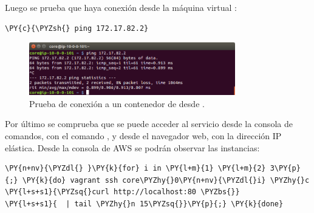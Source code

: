 Luego se prueba que haya conexión desde la máquina virtual :

\begin{framed_shaded}
\begin{Verbatim}[fontsize=\relsize{-2.5},fontseries=b,commandchars=\\\{\}]
\PY{c}{\PYZsh{} ping 172.17.82.2}
\end{Verbatim}
\end{framed_shaded}

\begin{figure}[H]
\centering
\includegraphics[width=0.8\textwidth]{images/figures/ping-1.png}
\caption{Prueba de conexión a un contenedor de  desde .}
\end{figure}

Por último se comprueba que se puede acceder al servicio desde la consola de comandos, con el comando , y desde el navegador web, con la dirección IP elástica. Desde la consola de AWS se podrán observar las instancias: 

\begin{framed_shaded}
\begin{Verbatim}[fontsize=\relsize{-2.5},fontseries=b,commandchars=\\\{\}]
\PY{n+nv}{\PYZdl{} }\PY{k}{for} i in \PY{l+m}{1} \PY{l+m}{2} 3\PY{p}{;} \PY{k}{do} vagrant ssh core\PYZhy{}0\PY{n+nv}{\PYZdl{}i} \PYZhy{}c \PY{l+s+s1}{\PYZsq{}curl http://localhost:80 \PYZbs{}}
\PY{l+s+s1}{  | tail \PYZhy{}n 15\PYZsq{}}\PY{p}{;} \PY{k}{done}
\end{Verbatim}
\end{framed_shaded}

